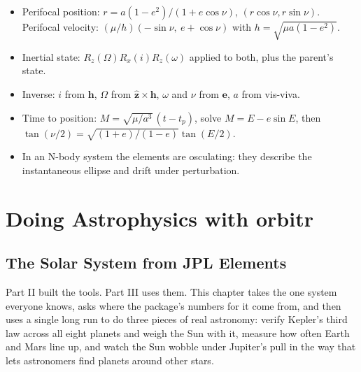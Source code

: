 \documentclass[
  10.5pt,
  letterpaper,
]{scrbook}
\providecommand{\tightlist}{%
  \setlength{\itemsep}{0pt}\setlength{\parskip}{0pt}}
\theoremstyle{plain}
\theoremstyle{remark}
\begin{document}
\begin{tcolorbox}[enhanced jigsaw, arc=.35mm, bottomrule=.15mm, bottomtitle=1mm, breakable, colback=white, colbacktitle=quarto-callout-tip-color!10!white, colframe=quarto-callout-tip-color-frame, coltitle=black, left=2mm, leftrule=.75mm, opacityback=0, opacitybacktitle=0.6, rightrule=.15mm, title={Key results}, titlerule=0mm, toprule=.15mm, toptitle=1mm]

\begin{itemize}
\tightlist
\item
  Perifocal position: \(r = a(1-e^2)/(1+e\cos\nu)\),
  \((r\cos\nu, r\sin\nu)\). Perifocal velocity:
  \((\mu/h)(-\sin\nu,\ e + \cos\nu)\) with \(h = \sqrt{\mu a(1-e^2)}\).
\item
  Inertial state: \(R_z(\Omega)R_x(i)R_z(\omega)\) applied to both, plus
  the parent's state.
\item
  Inverse: \(i\) from \(\mathbf{h}\), \(\Omega\) from
  \(\hat{\mathbf z}\times\mathbf{h}\), \(\omega\) and \(\nu\) from
  \(\mathbf{e}\), \(a\) from vis-viva.
\item
  Time to position: \(M = \sqrt{\mu/a^3}\,(t-t_p)\), solve
  \(M = E - e\sin E\), then
  \(\tan(\nu/2) = \sqrt{(1+e)/(1-e)}\tan(E/2)\).
\item
  In an N-body system the elements are osculating: they describe the
  instantaneous ellipse and drift under perturbation.
\end{itemize}

\end{tcolorbox}

\part{Doing Astrophysics with orbitr}

\chapter{The Solar System from JPL Elements}\label{sec-solar-system}

Part II built the tools. Part III uses them. This chapter takes the one
system everyone knows, asks where the package's numbers for it come
from, and then uses a single long run to do three pieces of real
astronomy: verify Kepler's third law across all eight planets and weigh
the Sun with it, measure how often Earth and Mars line up, and watch the
Sun wobble under Jupiter's pull in the way that lets astronomers find
planets around other stars.
\end{document}
